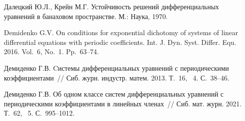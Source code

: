 \begin{thebibliography}{9}

Далецкий Ю.Л., Крейн М.Г.
Устойчивость решений дифференциальных уравнений в банаховом пространстве.
М.: Наука, 1970.

Demidenko G.V.
On conditions for exponential dichotomy of systems of 
linear differential equations with periodic coefficients.
Int. J. Dyn. Syst. Differ. Equ. 2016. Vol.~6, No.~1. Pp.~63--74.

Демиденко Г.В.
Cистемы дифференциальных уравнений с периодическими коэффициентами~//
Сиб. журн. индустр. матем. 2013. Т.~16, \textnumero~4. С.~38--46.

Демиденко Г.В.
Об одном классе систем дифференциальных уравнений
с периодическими коэффициентами в линейных членах~//
Сиб. мат. журн. 2021. Т.~62, \textnumero~5. С.~995--1012.

\end{thebibliography}




%

